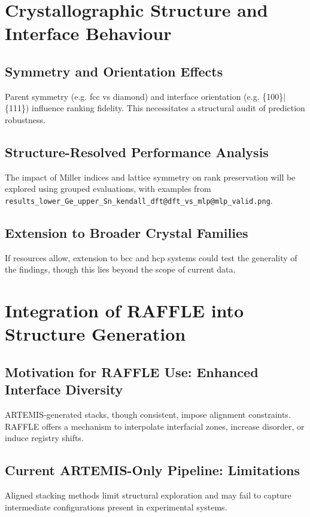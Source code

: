 \section{Crystallographic Structure and Interface Behaviour}

\subsection{Symmetry and Orientation Effects}
Parent symmetry (e.g. fcc vs diamond) and interface orientation (e.g. \{100\}|\{111\}) influence ranking fidelity. This
necessitates a structural audit of prediction robustness.

\subsection{Structure-Resolved Performance Analysis}
The impact of Miller indices and lattice symmetry on rank preservation will be explored using grouped evaluations, with
examples from \texttt{results\_lower\_Ge\_upper\_Sn\_kendall\_dft@dft\_vs\_mlp@mlp\_valid.png}.


\subsection{Extension to Broader Crystal Families}
If resources allow, extension to bcc and hcp systems could test the generality of the findings, though this lies beyond
the scope of current data.

\section{Integration of RAFFLE into Structure Generation}

\subsection{Motivation for RAFFLE Use: Enhanced Interface Diversity}
ARTEMIS-generated stacks, though consistent, impose alignment constraints. RAFFLE offers a mechanism to interpolate
interfacial zones, increase disorder, or induce registry shifts.

\subsection{Current ARTEMIS-Only Pipeline: Limitations}
Aligned stacking methods limit structural exploration and may fail to capture intermediate configurations present in
experimental systems.

